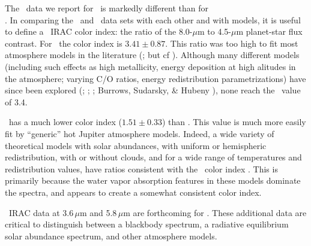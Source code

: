 The \spi\ data we report for \tresTwo\ is markedly different than for \tresOne\ \\ \citep{Charbonneau_Allen_Megeath:apj:2005a}.
In comparing the \tresTwo\ and \tresOne\ data sets with each other and with models, it is useful to define a \spi\ IRAC color index: the ratio of the 8.0-$\mu$m to 4.5-$\mu$m planet-star flux contrast.
For \tresOne\ the color index is \mbox{$3.41 \pm 0.87$}.
This ratio was too high to fit most atmosphere models in the literature (\citealp[see][]{Fortney_Marley_Lodders:apjl:2005a, Seager_Richardson_Hansen:apj:2005a, Barman_Hauschildt_Allard:apj:2005a};  but cf \citealt*{Burrows_Sudarsky_Hubeny:apj:2006a}).
Although many different models (including such effects as high metallicity, energy deposition at high alitudes in the atmosphere; varying C/O ratios, energy redistribution parametrizations) have since been explored (\citealp{Barman_Hauschildt_Allard:apj:2005a}; \citealp{Fortney_Marley_Lodders:apjl:2005a}; \citealp{Seager_Richardson_Hansen:apj:2005a};  Burrows, Sudarsky, \& Hubeny \citeyear{Burrows_Sudarsky_Hubeny:apj:2006a}), none reach the \tresOne\ value of 3.4.

\tresTwo\ has a much lower color index (\mbox{$1.51 \pm 0.33$}) than \tresOne.
This value is much more easily fit by ``generic'' hot Jupiter atmosphere models.
Indeed, a wide variety of theoretical models with solar abundances, with uniform or hemispheric redistribution, with or without clouds, and for a wide range of temperatures and redistribution values, have ratios consistent with the \tresTwo\ color index \citep[see, e.g.,][]{Fortney_Marley_Lodders:apjl:2005a, Barman_Hauschildt_Allard:apj:2005a, Charbonneau_Allen_Megeath:apj:2005a}.
This is primarily because the water vapor absorption features in these models dominate the spectra, and appears to create a somewhat consistent color index.

\spi\ IRAC data at 3.6\,$\mu$m and 5.8\,$\mu$m are forthcoming for \tresTwo.
These additional data are critical to distinguish between a blackbody spectrum, a radiative equilibrium solar abundance spectrum, and other atmosphere models.
